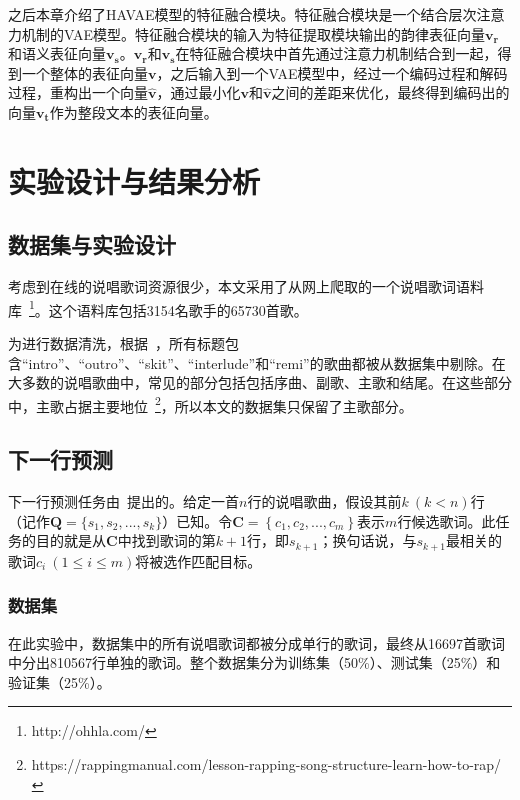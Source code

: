 之后本章介绍了HAVAE模型的特征融合模块。特征融合模块是一个结合层次注意力机制的VAE模型。特征融合模块的输入为特征提取模块输出的韵律表征向量$\bm {v_r}$和语义表征向量$\bm{v_s}$。$\bm {v_r}$和$\bm{v_s}$在特征融合模块中首先通过注意力机制结合到一起，得到一个整体的表征向量$\bm {v}$，之后输入到一个VAE模型中，经过一个编码过程和解码过程，重构出一个向量$\bm {\hat v}$，通过最小化$\bm {v}$和$\bm {\hat v}$之间的差距来优化，最终得到编码出的向量$\bm{v_t}$作为整段文本的表征向量。\par

\chapter{实验设计与结果分析} \label{chpt:exp}

\section{数据集与实验设计}
考虑到在线的说唱歌词资源很少，本文采用了从网上爬取的一个说唱歌词语料库~\footnote{http://ohhla.com/}。这个语料库包括3154名歌手的65730首歌。\par

为进行数据清洗，根据~\cite{Malmi2016dopelearning}，所有标题包含“intro”、“outro”、“skit”、“interlude”和“remi”的歌曲都被从数据集中剔除。在大多数的说唱歌曲中，常见的部分包括包括序曲、副歌、主歌和结尾。在这些部分中，主歌占据主要地位~\footnote{https://rappingmanual.com/lesson-rapping-song-structure-learn-how-to-rap/}，所以本文的数据集只保留了主歌部分。\par

\section{下一行预测} \label{sec:nextline}
下一行预测任务由~\cite{Malmi2016dopelearning}提出的。给定一首$n$行的说唱歌曲，假设其前$k~(k<n)$行（记作$\bm Q=\{s_1,s_2,...,s_k\}$）已知。令$\bm C={\left\{c_1,c_2,...,c_m\right\}}$表示$m$行候选歌词。此任务的目的就是从$\bm C $中找到歌词的第$k+1$行，即$s_{k+1}$；换句话说，与$s_{k+1}$最相关的歌词$c_i~(1\leq i \leq m)$将被选作匹配目标。\par

\subsection{数据集} \label{subsec:nextdata}
在此实验中，数据集中的所有说唱歌词都被分成单行的歌词，最终从16697首歌词中分出810567行单独的歌词。整个数据集分为训练集（50\%）、测试集（25\%）和验证集（25\%）。\par

